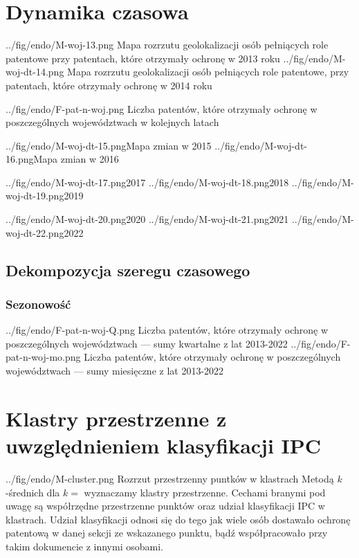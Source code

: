 \section{Dynamika czasowa}


  \newpage\figsides
{../fig/endo/M-woj-13.png}
{ Mapa rozrzutu geolokalizacji osób pełniących role patentowe 
  przy patentach, które otrzymały ochronę w 2013 roku}
{../fig/endo/M-woj-dt-14.png}
{ Mapa rozrzutu geolokalizacji osób pełniących role patentowe, 
  przy patentach, które otrzymały ochronę w 2014 roku}

  \figside
{../fig/endo/F-pat-n-woj.png}
{ Liczba patentów, które otrzymały ochronę w poszczególnych województwach 
  w kolejnych latach }

  \newpage\figsides
{../fig/endo/M-woj-dt-15.png}{Mapa zmian w 2015}
{../fig/endo/M-woj-dt-16.png}{Mapa zmian w 2016}

  \figsidesTri
{../fig/endo/M-woj-dt-17.png}{2017}
{../fig/endo/M-woj-dt-18.png}{2018}
{../fig/endo/M-woj-dt-19.png}{2019}

  \figsidesTri
{../fig/endo/M-woj-dt-20.png}{2020}
{../fig/endo/M-woj-dt-21.png}{2021}
{../fig/endo/M-woj-dt-22.png}{2022}




  \subsection
{Dekompozycja szeregu czasowego}


  \subsubsection
{Sezonowość}

  \figsides
{../fig/endo/F-pat-n-woj-Q.png}
{ Liczba patentów, które otrzymały ochronę w poszczególnych województwach 
  --- sumy kwartalne z lat 2013-2022 }
{../fig/endo/F-pat-n-woj-mo.png}
{ Liczba patentów, które otrzymały ochronę w poszczególnych województwach 
  --- sumy miesięczne z lat 2013-2022 }








\newpage
\section{Klastry przestrzenne z uwzględnieniem klasyfikacji \ac{IPC}}

\figside
  {../fig/endo/M-cluster.png}
    {Rozrzut przestrzenny puntków w klastrach}
{
  Metodą $k$-średnich dla $k=$ wyznaczamy klastry przestrzenne. 
  Cechami branymi pod uwagę są współrzędne przestrzenne punktów oraz
  udział klasyfikacji \ac{IPC} w klastrach. Udział klasyfikacji
  odnosi się do tego jak wiele osób dostawało ochronę patentową
  w danej sekcji ze wskazanego punktu, bądź współpracowało przy
  takim dokumencie z innymi osobami.
}

